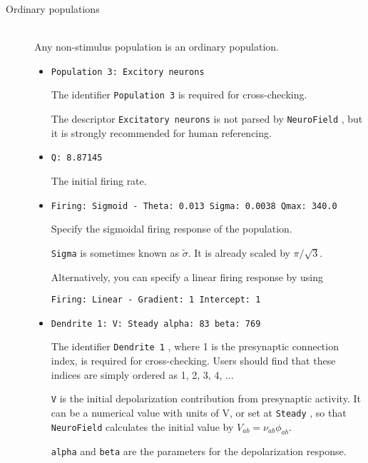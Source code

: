 \documentclass[12pt,a4paper]{article}
\newcommand{\type}[1]{ {\small\small\tt #1} }
\begin{document}
\begin{description}
\begin{itemize}
	\end{itemize}
\item[Ordinary populations]\ \\
	Any non-stimulus population is an ordinary population.

	\begin{itemize}
	\item
	\begin{lstlisting}
Population 3: Excitory neurons
	\end{lstlisting}
	The identifier \type{Population 3} is required for cross-checking.
	
	The descriptor \type{Excitatory neurons} is not parsed by \type{NeuroField}, but it is strongly recommended for human referencing.
	\item
	\begin{lstlisting}
Q: 8.87145
	\end{lstlisting}
	The initial firing rate.
	\item
	\begin{lstlisting}
Firing: Sigmoid - Theta: 0.013 Sigma: 0.0038 Qmax: 340.0
	\end{lstlisting}
	Specify the sigmoidal firing response of the population.

	\type{Sigma} is sometimes known as \(\tilde{\sigma}\). It is already scaled by \(\pi/\sqrt{3}\).

	Alternatively, you can specify a linear firing response by using
	\begin{lstlisting}
Firing: Linear - Gradient: 1 Intercept: 1
	\end{lstlisting}

	\item
	\begin{lstlisting}
Dendrite 1: V: Steady alpha: 83 beta: 769
	\end{lstlisting}
	The identifier \type{Dendrite 1}, where 1 is the presynaptic connection index, is required for cross-checking. Users should find that these indices are simply ordered as 1, 2, 3, 4, ...
	
	\type{V} is the initial depolarization contribution from presynaptic activity. It can be a numerical value with units of V, or set at \type{Steady}, so that \type{NeuroField} calculates the initial value by \(V_{ab}=\nu_{ab}\phi_{ab}\).

	\type{alpha} and \type{beta} are the parameters for the depolarization response.
	\end{itemize}
\end{description}
\end{document}
